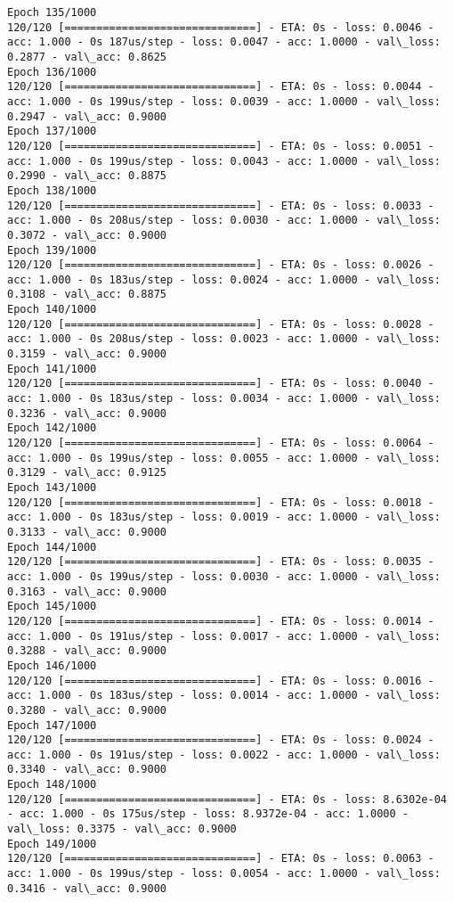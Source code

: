 \documentclass[11pt]{article}
\begin{document}
\begin{Verbatim}[commandchars=\\\{\}]
Epoch 135/1000
120/120 [==============================] - ETA: 0s - loss: 0.0046 - acc: 1.000 - 0s 187us/step - loss: 0.0047 - acc: 1.0000 - val\_loss: 0.2877 - val\_acc: 0.8625
Epoch 136/1000
120/120 [==============================] - ETA: 0s - loss: 0.0044 - acc: 1.000 - 0s 199us/step - loss: 0.0039 - acc: 1.0000 - val\_loss: 0.2947 - val\_acc: 0.9000
Epoch 137/1000
120/120 [==============================] - ETA: 0s - loss: 0.0051 - acc: 1.000 - 0s 199us/step - loss: 0.0043 - acc: 1.0000 - val\_loss: 0.2990 - val\_acc: 0.8875
Epoch 138/1000
120/120 [==============================] - ETA: 0s - loss: 0.0033 - acc: 1.000 - 0s 208us/step - loss: 0.0030 - acc: 1.0000 - val\_loss: 0.3072 - val\_acc: 0.9000
Epoch 139/1000
120/120 [==============================] - ETA: 0s - loss: 0.0026 - acc: 1.000 - 0s 183us/step - loss: 0.0024 - acc: 1.0000 - val\_loss: 0.3108 - val\_acc: 0.8875
Epoch 140/1000
120/120 [==============================] - ETA: 0s - loss: 0.0028 - acc: 1.000 - 0s 208us/step - loss: 0.0023 - acc: 1.0000 - val\_loss: 0.3159 - val\_acc: 0.9000
Epoch 141/1000
120/120 [==============================] - ETA: 0s - loss: 0.0040 - acc: 1.000 - 0s 183us/step - loss: 0.0034 - acc: 1.0000 - val\_loss: 0.3236 - val\_acc: 0.9000
Epoch 142/1000
120/120 [==============================] - ETA: 0s - loss: 0.0064 - acc: 1.000 - 0s 199us/step - loss: 0.0055 - acc: 1.0000 - val\_loss: 0.3129 - val\_acc: 0.9125
Epoch 143/1000
120/120 [==============================] - ETA: 0s - loss: 0.0018 - acc: 1.000 - 0s 183us/step - loss: 0.0019 - acc: 1.0000 - val\_loss: 0.3133 - val\_acc: 0.9000
Epoch 144/1000
120/120 [==============================] - ETA: 0s - loss: 0.0035 - acc: 1.000 - 0s 199us/step - loss: 0.0030 - acc: 1.0000 - val\_loss: 0.3163 - val\_acc: 0.9000
Epoch 145/1000
120/120 [==============================] - ETA: 0s - loss: 0.0014 - acc: 1.000 - 0s 191us/step - loss: 0.0017 - acc: 1.0000 - val\_loss: 0.3288 - val\_acc: 0.9000
Epoch 146/1000
120/120 [==============================] - ETA: 0s - loss: 0.0016 - acc: 1.000 - 0s 183us/step - loss: 0.0014 - acc: 1.0000 - val\_loss: 0.3280 - val\_acc: 0.9000
Epoch 147/1000
120/120 [==============================] - ETA: 0s - loss: 0.0024 - acc: 1.000 - 0s 191us/step - loss: 0.0022 - acc: 1.0000 - val\_loss: 0.3340 - val\_acc: 0.9000
Epoch 148/1000
120/120 [==============================] - ETA: 0s - loss: 8.6302e-04 - acc: 1.000 - 0s 175us/step - loss: 8.9372e-04 - acc: 1.0000 - val\_loss: 0.3375 - val\_acc: 0.9000
Epoch 149/1000
120/120 [==============================] - ETA: 0s - loss: 0.0063 - acc: 1.000 - 0s 199us/step - loss: 0.0054 - acc: 1.0000 - val\_loss: 0.3416 - val\_acc: 0.9000

\end{Verbatim}
\end{document}
